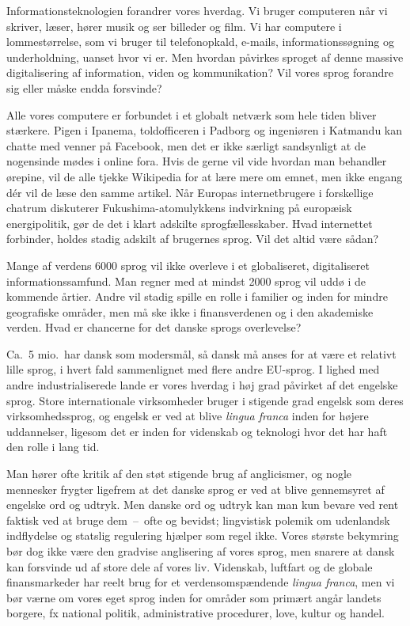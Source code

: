 \begin{multicols}{2}
 
Informationsteknologien forandrer vores hverdag. Vi bruger computeren
n\aa r vi skriver, l\ae ser, h\o rer musik og ser billeder og film. Vi har
computere i lommest\o rrelse, som vi bruger til telefonopkald, e-mails,
informationss\o gning og underholdning, uanset hvor vi er. Men hvordan
p\aa virkes sproget af denne massive digitalisering af information, viden
og kommunikation? Vil vores sprog forandre sig eller m\aa ske endda
forsvinde?

Alle vores computere er forbundet i et globalt netv\ae rk som hele
tiden bliver st\ae rkere. Pigen i Ipanema, toldofficeren i Padborg og
ingeni\o ren i Katmandu kan chatte med venner \mbox{p\aa} Facebook,
men det er ikke s\ae rligt sandsynligt at de nogensinde m\o des i
online fora. Hvis de gerne vil vide hvordan man behandler \o repine,
vil de alle tjekke Wikipedia for at l\ae re mere om emnet, men ikke
engang d\'{e}r vil de l\ae se den samme artikel. N\aa r Europas
internetbrugere i forskellige chatrum diskuterer
Fukushima-atomulykkens indvirkning \mbox{p\aa} europ\ae isk
energipolitik, g\o r de det i klart adskilte sprogf\ae llesskaber.
Hvad internettet forbinder, holdes stadig adskilt af brugernes sprog.
Vil det altid v\ae re s\aa dan?

Mange af verdens 6000 sprog vil ikke overleve i et globaliseret,
digitaliseret informationssamfund. Man regner med at mindst 2000 sprog
vil \mbox{udd\o} i de kommende \aa rtier. Andre vil stadig spille en
rolle i familier og inden for mindre geografiske omr\aa der, men m\aa
ske ikke i finansverdenen og i den akademiske verden. Hvad er
chancerne for det danske sprogs overlevelse?

Ca.\ 5 mio.\ har dansk som modersm\aa l, \mbox{s\aa} dansk \mbox{m\aa}
anses for at v\ae re et relativt lille sprog, i hvert fald
sammenlignet med flere andre EU-sprog. I lighed med andre
industrialiserede lande er vores hverdag i h\o j grad p\aa virket af
det engelske sprog. Store internationale virksomheder bruger i
stigende grad engelsk som deres virksomhedssprog, og engelsk er ved at
blive {\it lingua franca} inden for h\o jere uddannelser, ligesom det
er inden for videnskab og teknologi hvor det har haft den rolle i lang
tid.

Man h\o rer ofte kritik af den st\o t stigende brug af anglicismer, og
nogle mennesker frygter ligefrem at det danske sprog er ved at blive
gennemsyret af engelske ord og udtryk. Men danske ord og udtryk kan
man kun bevare ved rent faktisk ved at bruge dem~--~ofte og bevidst;
lingvistisk polemik om udenlandsk indflydelse og statslig regulering
hj\ae lper som regel ikke. Vores st\o rste bekymring b\o r dog ikke
v\ae re den gradvise anglisering af vores sprog, men snarere at dansk
kan forsvinde ud af store dele af vores liv. Videnskab, luftfart og de
globale finansmarkeder har reelt brug for et verdensomsp\ae ndende
{\it lingua franca}, men vi b\o r v\ae rne om vores eget sprog inden
for omr\aa der som prim\ae rt ang\aa r landets borgere, fx national
politik, administrative procedurer, love, kultur og handel.


\end{multicols}

